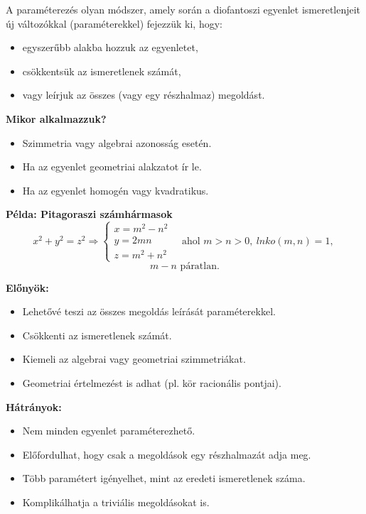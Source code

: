 A paraméterezés olyan módszer, amely során a diofantoszi egyenlet
ismeretlenjeit új változókkal (paraméterekkel) fejezzük ki, hogy: 
\begin{itemize}
	\item egyszerűbb alakba hozzuk az egyenletet, 
	\item csökkentsük az ismeretlenek számát, 
	\item vagy leírjuk az összes (vagy egy részhalmaz) megoldást. 
\end{itemize}
\vspace{0.5em}
\textbf{Mikor alkalmazzuk?} 
\begin{itemize}
	\item Szimmetria vagy algebrai azonosság esetén. 
	\item Ha az egyenlet geometriai alakzatot ír le. 
	\item Ha az egyenlet homogén vagy kvadratikus. 
\end{itemize}
\vspace{0.5em}
\textbf{Példa: Pitagoraszi számhármasok} 
\[
x^{2}+y^{2}=z^{2}\Rightarrow\begin{cases}
	x=m^{2}-n^{2}\\
	y=2mn\\
	z=m^{2}+n^{2}
\end{cases}\quad\text{ahol }m>n>0,\ lnko(m,n)=1,\ 
\]
\[
m-n\text{ páratlan.}
\]

\noindent\textbf{Előnyök:} 
\begin{itemize}
	\item Lehetővé teszi az összes megoldás leírását paraméterekkel. 
	\item Csökkenti az ismeretlenek számát. 
	\item Kiemeli az algebrai vagy geometriai szimmetriákat. 
	\item Geometriai értelmezést is adhat (pl. kör racionális pontjai). 
\end{itemize}
\vspace{0.5em}
\textbf{Hátrányok:} 
\begin{itemize}
	\item Nem minden egyenlet paraméterezhető. 
	\item Előfordulhat, hogy csak a megoldások egy részhalmazát adja meg. 
	\item Több paramétert igényelhet, mint az eredeti ismeretlenek száma. 
	\item Komplikálhatja a triviális megoldásokat is. 
\end{itemize}

